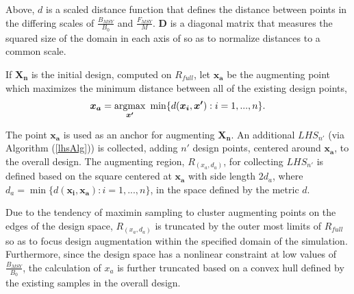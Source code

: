 \documentclass[12pt]{article}
\newcommand{\argmax}{\operatornamewithlimits{argmax}}
\begin{document}
%
Above, $d$ is a scaled distance function that defines the distance between 
points in the differing scales of $\frac{B_{MSY}}{B_0}$ and $\frac{F_{MSY}}{M}$.
$\bm{D}$ is a diagonal matrix that measures the squared size of the domain in each 
axis of so as to normalize distances to a common scale. 

%
If $\bm{X_n}$ is the initial design, computed on $R_{full}$, let $\bm{x_a}$ be the 
augmenting point which maximizes the minimum distance between all of the existing 
design points,
%
\begin{align}
	\bm{x_a} = \argmax_{\bm{x'}} ~\min\{ d(\bm{x_i}, \bm{x'}): i=1,...,n \}.
\end{align} 
%

%
The point $\bm{x_a}$ is used as an anchor for augmenting $\bm{X_n}$. %
An additional $LHS_{n'}$ (via Algorithm (\ref{lhsAlg})) is collected, adding 
$n'$ design points, centered around $\bm{x_a}$, to the overall design. %
The augmenting region, $R_{(x_a, d_a)}$, for collecting $LHS_{n'}$ is defined 
based on the square centered at $\bm{x_a}$ with side length $2d_a$, where 
\mbox{$d_a = \min\{ d(\bm{x_i}, \bm{x_a}): i=1,...,n \}$}, in the space defined 
by the metric $d$.
%

%
Due to the tendency of maximin sampling to cluster augmenting points on the edges 
of the design space, $R_{(x_a, d_a)}$ is truncated by the outer most limits of 
$R_{full}$ so as to focus design augmentation within the specified domain of the 
simulation. Furthermore, since the design space has a nonlinear constraint at low 
values of $\frac{B_{MSY}}{B_0}$, the calculation of $x_a$ is further truncated 
based on a convex hull defined by the existing samples in the overall design.

%
\end{document}
